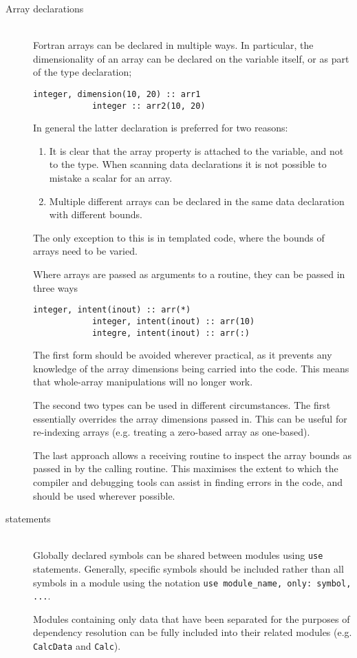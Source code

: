 \documentclass[a4paper,notitlepage,dvipsnames]{scrreprt}
\newcommand\headitem[1]{\needspace{1.5\baselineskip}\item[{\boldmath #1 \nopagebreak}] \hfill \\ \nopagebreak}
\let\code\lstinline
\begin{document}
\begin{description}
	\headitem{Array declarations}
		Fortran arrays can be declared in multiple ways. In particular, the
		dimensionality of an array can be declared on the variable itself,
		or as part of the type declaration;
		\begin{lstlisting}[gobble=8]
			integer, dimension(10, 20) :: arr1
			integer :: arr2(10, 20)
		\end{lstlisting}
		In general the latter declaration is preferred for two reasons:
		\begin{enumerate}
			\item
				It is clear that the array property is attached to the
				variable, and not to the type. When scanning data declarations
				it is not possible to mistake a scalar for an array.
			\item
				Multiple different arrays can be declared in the same data
				declaration with different bounds.
		\end{enumerate}
		The only exception to this is in templated code, where the bounds of
		arrays need to be varied.

		Where arrays are passed as arguments to a routine, they can be
		passed in three ways
		\begin{lstlisting}[gobble=8]
			integer, intent(inout) :: arr(*)
			integer, intent(inout) :: arr(10)
			integre, intent(inout) :: arr(:)
		\end{lstlisting}
		The first form should be avoided wherever practical, as it prevents
		any knowledge of the array dimensions being carried into the code.
		This means that whole-array manipulations will no longer work.

		The second two types can be used in different circumstances. The first
		essentially overrides the array dimensions passed in. This can be
		useful for re-indexing arrays (e.g. treating a zero-based array as
		one-based).

		The last approach allows a receiving routine to inspect the array
		bounds as passed in by the calling routine. This maximises the extent
		to which the compiler and debugging tools can assist in finding
		errors in the code, and should be used wherever possible.

	\headitem{{\ttfamily use} statements}
		Globally declared symbols can be shared between modules using
		\code{use} statements. Generally, specific symbols should be
		included rather than all symbols in a module using the notation
		\code{use module_name, only: symbol, ...}.

		Modules containing only data that have been separated for the purposes
		of dependency resolution can be fully included into their related
		modules (e.g. \code{CalcData} and \code{Calc}).


\end{description}
\end{document}

